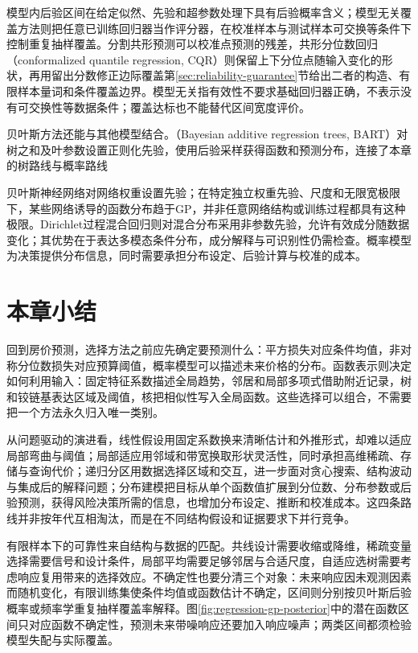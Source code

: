模型内后验区间在给定似然、先验和超参数处理下具有后验概率含义；模型无关覆盖方法则把任意已训练回归器当作评分器，在校准样本与测试样本可交换等条件下控制重复抽样覆盖。分割共形预测可以校准点预测的残差，共形分位数回归（conformalized quantile regression, CQR）则保留上下分位点随输入变化的形状，再用留出分数修正边际覆盖第\ref{sec:reliability-guarantee}节给出二者的构造、有限样本量词和条件覆盖边界。模型无关指有效性不要求基础回归器正确，不表示没有可交换性等数据条件；覆盖达标也不能替代区间宽度评价。

贝叶斯方法还能与其他模型结合。（Bayesian additive regression trees, BART）对树之和及叶参数设置正则化先验，使用后验采样获得函数和预测分布，连接了本章的树路线与概率路线

贝叶斯神经网络对网络权重设置先验；在特定独立权重先验、尺度和无限宽极限下，某些网络诱导的函数分布趋于GP，并非任意网络结构或训练过程都具有这种极限。Dirichlet过程混合回归则对混合分布采用非参数先验，允许有效成分随数据变化；其优势在于表达多模态条件分布，成分解释与可识别性仍需检查。概率模型为决策提供分布信息，同时需要承担分布设定、后验计算与校准的成本。

\section{本章小结}
\label{sec:regression-summary}

回到房价预测，选择方法之前应先确定要预测什么：平方损失对应条件均值，非对称分位数损失对应预算阈值，概率模型可以描述未来价格的分布。函数表示则决定如何利用输入：固定特征系数描述全局趋势，邻居和局部多项式借助附近记录，树和铰链基表达区域及阈值，核把相似性写入全局函数。这些选择可以组合，不需要把一个方法永久归入唯一类别。

从问题驱动的演进看，线性假设用固定系数换来清晰估计和外推形式，却难以适应局部弯曲与阈值；局部适应用邻域和带宽换取形状灵活性，同时承担高维稀疏、存储与查询代价；递归分区用数据选择区域和交互，进一步面对贪心搜索、结构波动与集成后的解释问题；分布建模把目标从单个函数值扩展到分位数、分布参数或后验预测，获得风险决策所需的信息，也增加分布设定、推断和校准成本。这四条路线并非按年代互相淘汰，而是在不同结构假设和证据要求下并行竞争。

有限样本下的可靠性来自结构与数据的匹配。共线设计需要收缩或降维，稀疏变量选择需要信号和设计条件，局部平均需要足够邻居与合适尺度，自适应选树需要考虑响应复用带来的选择效应。不确定性也要分清三个对象：未来响应因未观测因素而随机变化，有限训练集使条件均值或函数估计不确定，区间则分别按贝叶斯后验概率或频率学重复抽样覆盖率解释。图\ref{fig:regression-gp-posterior}中的潜在函数区间只对应函数不确定性，预测未来带噪响应还要加入响应噪声；两类区间都须检验模型失配与实际覆盖。

